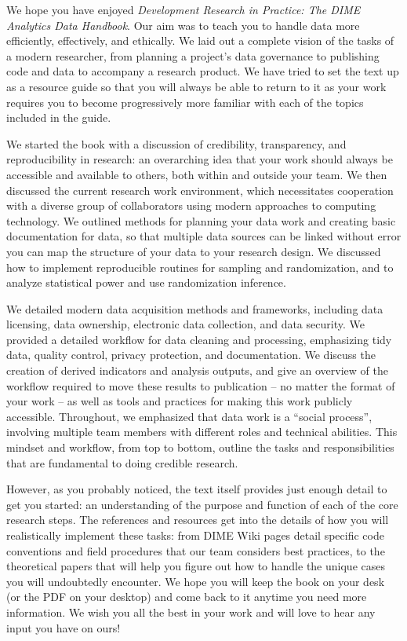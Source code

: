 We hope you have enjoyed \textit{Development Research in Practice: The DIME Analytics Data Handbook}.
Our aim was to teach you to handle data more efficiently, effectively, and ethically.
We laid out a complete vision of the tasks of a modern researcher,
from planning a project's data governance to publishing code and data
to accompany a research product.
We have tried to set the text up as a resource guide
so that you will always be able to return to it
as your work requires you to become progressively more familiar
with each of the topics included in the guide.

We started the book with a discussion of 
credibility, transparency, and reproducibility in research:
an overarching idea that your work should always be
accessible and available to others, both within and outside your team.
We then discussed the current research work environment,
which necessitates cooperation with a diverse group of collaborators
using modern approaches to computing technology.
We outlined methods for planning your data work
and creating basic documentation for data,
so that multiple data sources can be linked without error
you can map the structure of your data to your research design.
We discussed how to implement reproducible routines for sampling and randomization,
and to analyze statistical power and use randomization inference.

We detailed modern data acquisition methods and frameworks,
including data licensing, data ownership,
electronic data collection, and data security.
We provided a detailed workflow for data cleaning and processing,
emphasizing tidy data, quality control, privacy protection, and documentation.
We discuss the creation of derived indicators and analysis outputs,
and give an overview of the workflow required to move these results
to publication -- no matter the format of your work --
as well as tools and practices for making this work publicly accessible.
Throughout, we emphasized that data work is a ``social process'',
involving multiple team members with different roles and technical abilities.
This mindset and workflow, from top to bottom,
outline the tasks and responsibilities
that are fundamental to doing credible research.

However, as you probably noticed, the text itself provides
just enough detail to get you started:
an understanding of the purpose and function of each of the core research steps.
The references and resources get into the details
of how you will realistically implement these tasks:
from DIME Wiki pages detail specific code conventions
and field procedures that our team considers best practices,
to the theoretical papers that will help you figure out
how to handle the unique cases you will undoubtedly encounter.
We hope you will keep the book on your desk
(or the PDF on your desktop)
and come back to it anytime you need more information.
We wish you all the best in your work
and will love to hear any input you have on ours!

